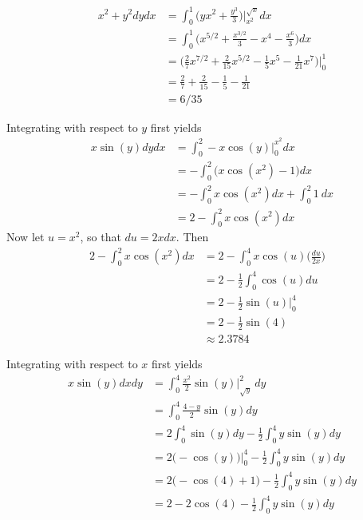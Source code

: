 \documentclass{article}
\begin{document}
\begin{align*} 
  \mathop{\int_0^1 \!\!\! \int_{x^2}^{\sqrt{x}}} x^2+y^2 dydx 
  &= \int_0^1 \Big(yx^2 + \frac{y^3}{3} \Big)\Big|_{x^2}^{\sqrt{x}} dx \\
  &= \int_0^1 \Big(x^{5/2} + \frac{x^{3/2}}{3} - x^4 - \frac{x^6}{3}\Big) dx \\
  &= \Big( \frac{2}{7} x^{7/2} + \frac{2}{15}x^{5/2} - \frac{1}{5}x^5 - \frac{1}{21}x^7\Big)\Big|_0^1 \\
  &= \frac{2}{7} + \frac{2}{15} - \frac{1}{5} - \frac{1}{21} \\
  &= 6/35
\end{align*}
\item %
\BEN 
\item Integrating with respect to $y$ first yields
\begin{align*} 
  \mathop{\int_0^2 \!\!\! \int_0^{x^2}} x\sin (y) dydx 
  &= \int_0^2 -x\cos(y)\Big|_0^{x^2} dx \\
  &= - \int_0^2 \Big(x\cos(x^2)-1\Big) dx \\
  &= - \int_0^2x\cos(x^2) dx +  \int_0^2 1 \ dx \\    
  &= 2 - \int_0^2x\cos(x^2) dx 
\end{align*}
Now let $u=x^2$, so that $du = 2xdx$. Then 
\begin{align*} 
  2 - \int_0^2x\cos(x^2) dx  
  &=  2 - \int_0^4 x\cos(u)\Big(\frac{du}{2x}\Big)\\
  &=  2 - \frac{1}{2} \int_0^4 \cos(u)du \\
  &=  2 - \frac{1}{2} \sin(u) \Big|_0^4 \\
  &=  2 - \frac{1}{2} \sin(4) \\
  &\approx 2.3784
\end{align*}
\item Integrating with respect to $x$ first yields
\begin{align*} 
  \mathop{\int_0^4 \!\!\! \int_{\sqrt{y}}^{2} } x\sin (y) dxdy
  &= \int_0^4 \frac{x^2}{2}\sin(y)\Big|_{\sqrt{y}}^{2} \ dy \\
  &= \int_0^4 \frac{4-y}{2}\sin(y) dy \\
  &= 2 \int_0^4 \sin(y) dy - \frac{1}{2} \int_0^4 y\sin(y) dy \\
  &= 2 \big( - \cos(y) \big)\big|_0^4 - \frac{1}{2} \int_0^4 y\sin(y) dy \\
  &= 2 \big( - \cos(4) + 1 \big) - \frac{1}{2} \int_0^4 y\sin(y) dy \\
  &= 2  - 2\cos(4)  - \frac{1}{2} \int_0^4 y\sin(y) dy \\
\end{align*}
\end{document}
